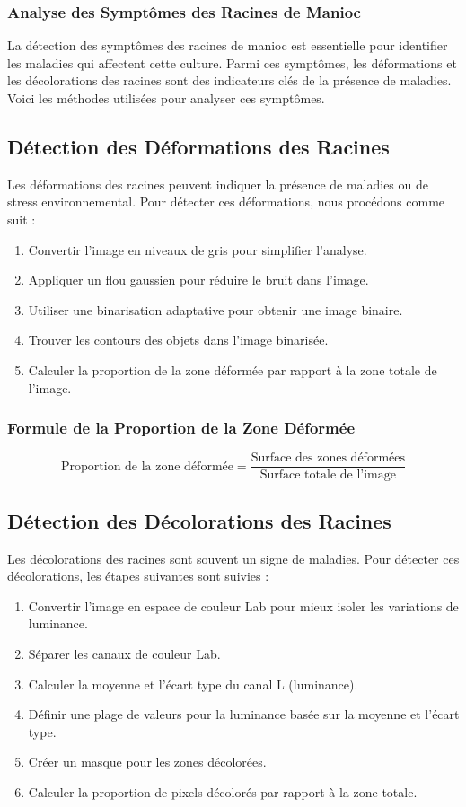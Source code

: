 \documentclass{article}
\begin{document}
	
	\subsubsection{Analyse des Symptômes des Racines de Manioc}
	
	La détection des symptômes des racines de manioc est essentielle pour identifier les maladies qui affectent cette culture. Parmi ces symptômes, les déformations et les décolorations des racines sont des indicateurs clés de la présence de maladies. Voici les méthodes utilisées pour analyser ces symptômes.
	
	\subsection*{Détection des Déformations des Racines}
	
	Les déformations des racines peuvent indiquer la présence de maladies ou de stress environnemental. Pour détecter ces déformations, nous procédons comme suit :
	\begin{enumerate}
		\item Convertir l'image en niveaux de gris pour simplifier l'analyse.
		\item Appliquer un flou gaussien pour réduire le bruit dans l'image.
		\item Utiliser une binarisation adaptative pour obtenir une image binaire.
		\item Trouver les contours des objets dans l'image binarisée.
		\item Calculer la proportion de la zone déformée par rapport à la zone totale de l'image.
	\end{enumerate}
	
	\subsubsection*{Formule de la Proportion de la Zone Déformée}
	\[
	\text{Proportion de la zone déformée} = \frac{\text{Surface des zones déformées}}{\text{Surface totale de l'image}}
	\]
	
	\subsection*{Détection des Décolorations des Racines}
	
	Les décolorations des racines sont souvent un signe de maladies. Pour détecter ces décolorations, les étapes suivantes sont suivies :
	\begin{enumerate}
		\item Convertir l'image en espace de couleur Lab pour mieux isoler les variations de luminance.
		\item Séparer les canaux de couleur Lab.
		\item Calculer la moyenne et l'écart type du canal L (luminance).
		\item Définir une plage de valeurs pour la luminance basée sur la moyenne et l'écart type.
		\item Créer un masque pour les zones décolorées.
		\item Calculer la proportion de pixels décolorés par rapport à la zone totale.
	\end{enumerate}
	
\end{document}
